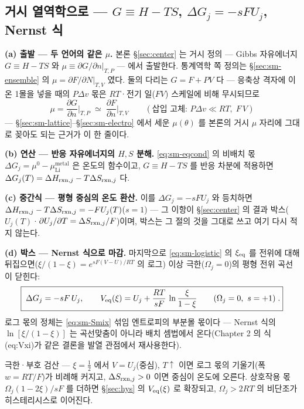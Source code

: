 
\subsection{거시 열역학으로 --- $G\equiv H-TS$, $\Delta G_j=-sFU_j$, Nernst 식}\label{sec:sm-macro}
\textbf{(a) 출발 --- 두 언어의 같은 $\mu$.} 본론 \S\ref{sec:center} 는 거시 정의 --- Gibbs 자유에너지
$G\equiv H-TS$ 와 $\mu\equiv\partial G/\partial n|_{T,P}$ --- 에서 출발한다. 통계역학 쪽 정의는
\S\ref{sec:sm-ensemble} 의 $\mu=\partial F/\partial N|_{T,V}$ 였다. 둘의 다리는 $G=F+PV$ 다 --- 응축상
격자에 이온 1몰을 넣을 때의 $P\Delta v$ 몫은 $RT$·전기 일($FV$) 스케일에 비해 무시되므로
\begin{equation}
\mu=\frac{\partial G}{\partial n}\Big|_{T,P}\;\simeq\;\frac{\partial F}{\partial n}\Big|_{T,V}
\qquad(\text{삽입 고체: }P\Delta v\ll RT,\;F\,V)
\label{eq:sm-mubridge}
\end{equation}
--- \S\ref{sec:sm-lattice}--\S\ref{sec:sm-electro} 에서 세운 $\mu(\theta)$ 를 본론의 거시 $\mu$ 자리에
그대로 꽂아도 되는 근거가 이 한 줄이다.

\textbf{(b) 연산 --- 반응 자유에너지의 $H,S$ 분해.} \eqref{eq:sm-eqcond} 의 비배치 몫
$\Delta G_j=\mu^0-\mu_\mathrm{Li}^\mathrm{metal}$ 은 온도의 함수이고, $G\equiv H-TS$ 를 반응 차분에 적용하면
$\Delta G_j(T)=\Delta H_{\mathrm{rxn},j}-T\Delta S_{\mathrm{rxn},j}$ 다.

\textbf{(c) 중간식 --- 평형 중심의 온도 환산.}
이를 $\Delta G_j=-sFU_j$ 와 등치하면 $\Delta H_{\mathrm{rxn},j}-T\Delta S_{\mathrm{rxn},j}=-FU_j(T)$($s{=}1$) --- 그 이항이
\S\ref{sec:center} 의 결과 박스($U_j(T)$·$\partial U_j/\partial T=\Delta S_{\mathrm{rxn},j}/F$)이며, 박스는 그 절의
것을 그대로 쓰고 여기 다시 적지 않는다.

\textbf{(d) 박스 --- Nernst 식으로 마감.} 마지막으로 \eqref{eq:sm-logistic} 의 $\xi_{\mathrm{eq}}$ 를 전위에 대해
뒤집으면($\xi/(1-\xi)=e^{sF(V-U)/RT}$ 의 로그) 이상 극한($\Omega_j=0$)의 평형 전위 곡선이 닫힌다:
\begin{equation}
\boxed{\;
\Delta G_j=-sF\,U_j,
\qquad
V_{\mathrm{eq}}(\xi)=U_j+\frac{RT}{sF}\,\ln\frac{\xi}{1-\xi}
\qquad(\Omega_j=0,\ s=+1)\;.}
\label{eq:sm-nernst}
\end{equation}
로그 몫의 정체는 \eqref{eq:sm-Smix} 섞임 엔트로피의 부분몰 몫이다 --- Nernst 식의 $\ln[\xi/(1-\xi)]$ 는
곡선맞춤이 아니라 배치 셈법에서 온다(Chapter 2 의 식 (eq:Vxi)가 같은 결론을 발열 관점에서 재사용한다).
\begin{verifybox}
극한·부호 검산 --- $\xi=\tfrac12$ 에서 $V=U_j$(중심), $T\!\uparrow$ 이면 로그 몫의 기울기(폭 $w=RT/F$)가
비례해 커지고, $\Delta S_{\mathrm{rxn},j}>0$ 이면 중심이 온도에 오른다. 상호작용 몫 $\Omega_j(1-2\xi)/sF$ 를 더하면
\S\ref{sec:hys} 의 $V_{\mathrm{eq}}(\xi)$ 로 확장되고, $\Omega_j>2RT$ 의 비단조가 히스테리시스로 이어진다.
\end{verifybox}

